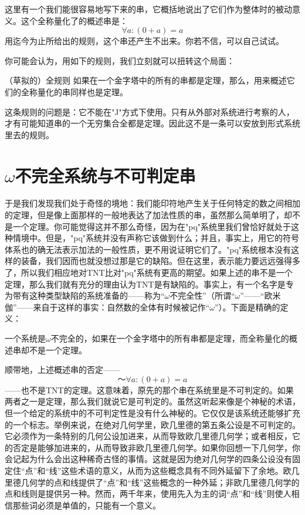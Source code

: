 这里有一个我们能很容易地写下来的串，它概括地说出了它们作为整体时的被动意义。这个全称量化了的概述串是：
\[
\forall a:(0+a)=a
\]
用迄今为止所给出的规则，这个串还产生不出来。你若不信，可以自己试试。

你可能会认为，用如下的规则，我们立刻就可以扭转这个局面：

\begin{thm}[\parindent]{（草拟的）全规则}
如果在一个金字塔中的所有的串都是定理，那么，用来概述它们的全称量化的串同样也是定理。
\end{thm}

这条规则的问题是：它不能在"J"方式下使用。只有从外部对系统进行考察的人，才有可能知道串的一个无穷集合全都是定理。因此这不是一条可以安放到形式系统里去的规则。

\section{\texorpdfstring{$\omega$}{\textomega}不完全系统与不可判定串}

于是我们发现我们处于奇怪的境地：我们能印符地产生关于任何特定的数之间相加的定理，但是像上面那样的一般地表达了加法性质的串，虽然那么简单明了，却不是一个定理。你可能觉得这并不那么奇怪，因为在"pq"系统里我们曾恰好就处于这种情境中。但是，"pq"系统并没有声称它该做到什么；并且，事实上，用它的符号体系也的确无法表示加法的一般性质，更不用说证明它们了。"pq"系统根本没有这样的装备，我们因而也就没想过那是它的缺陷。但在这里，表示能力要远远强得多了，所以我们相应地对TNT比对"pq"系统有更高的期望。如果上述的串不是一个定理，那么我们就有充分的理由认为TNT是有缺陷的。事实上，有一个名字是专为带有这种类型缺陷的系统准备的——称为“$\omega$不完全性”（所谓“$\omega$”——“欧米伽”——来自于这样的事实：自然数的全体有时候被记作“$\omega$”）。下面是精确的定义：

\begin{block}
一个系统是$\omega$不完全的，如果在一个金字塔中的所有串都是定理，而全称量化的概述串却不是一个定理。
\end{block}

顺带地，上述概述串的否定——
\[
～\forall a:(0+a)=a
\]
——也不是TNT的定理。这意味着，原先的那个串在系统里是不可判定的。如果两者之一是定理，那么我们就说它是可判定的。虽然这听起来像是个神秘的术语，但一个给定的系统中的不可判定性是没有什么神秘的。它仅仅是该系统还能够扩充的一个标志。举例来说，在绝对几何学里，欧几里德的第五条公设是不可判定的。它必须作为一条特别的几何公设加进来，从而导致欧几里德几何学；或者相反，它的否定是能够加进来的，从而导致非欧几里德几何学。如果你回想一下几何学，你会记起为什么会出这种稀奇古怪的事情。这就是因为绝对几何学的四条公设没有固定住“点”和“线”这些术语的意义，从而为这些概念具有不同外延留下了余地。欧几里德几何学的点和线提供了“点”和“线”这些概念的一种外延；非欧几里德几何学的点和线则是提供另一种。然而，两千年来，使用先入为主的词“点”和“线”则使人相信那些词必须是单值的，只能有一个意义。

